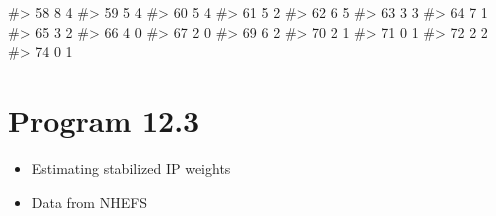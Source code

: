 \documentclass[
  10pt,
  a4paper,
]{book}
\newenvironment{Shaded}{\begin{snugshade}}{\end{snugshade}}
\newcommand{\CommentTok}[1]{\textcolor[rgb]{0.37,0.37,0.37}{#1}}
\providecommand{\tightlist}{%
  \setlength{\itemsep}{0pt}\setlength{\parskip}{0pt}}
\begin{document}
\begin{Shaded}
\begin{Highlighting}[]
\CommentTok{\#\textgreater{}   58  8  4}
\CommentTok{\#\textgreater{}   59  5  4}
\CommentTok{\#\textgreater{}   60  5  4}
\CommentTok{\#\textgreater{}   61  5  2}
\CommentTok{\#\textgreater{}   62  6  5}
\CommentTok{\#\textgreater{}   63  3  3}
\CommentTok{\#\textgreater{}   64  7  1}
\CommentTok{\#\textgreater{}   65  3  2}
\CommentTok{\#\textgreater{}   66  4  0}
\CommentTok{\#\textgreater{}   67  2  0}
\CommentTok{\#\textgreater{}   69  6  2}
\CommentTok{\#\textgreater{}   70  2  1}
\CommentTok{\#\textgreater{}   71  0  1}
\CommentTok{\#\textgreater{}   72  2  2}
\CommentTok{\#\textgreater{}   74  0  1}
\end{Highlighting}
\end{Shaded}

\section{Program 12.3}\label{program-12.3}

\begin{itemize}
\tightlist
\item
  Estimating stabilized IP weights
\item
  Data from NHEFS
\end{itemize}
\end{document}
